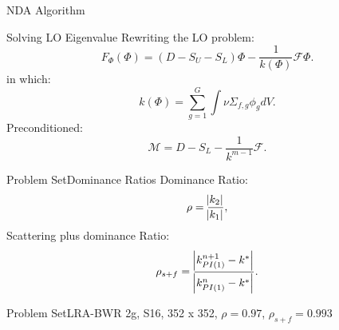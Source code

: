 \documentclass[sans,mathserif,aspectratio=169]{beamer}
\begin{document}
\begin{frame}{NDA Algorithm}
\centering
{}
\end{frame}

\begin{frame}{Solving LO Eigenvalue}
Rewriting the LO problem:
\begin{equation*}
F_\Phi \left( \Phi \right) = \left( D - S_U - S_L \right) \Phi - \frac{1}{k(\Phi)} \mathscr{F} \Phi.
\end{equation*}
in which:
\begin{equation*}
k\left( \Phi \right) = \sum_{g=1}^G \int \nu \Sigma_{f,g} \phi_g dV.
\end{equation*}
Preconditioned:
\begin{equation*}
\mathscr{M} = D - S_L - \frac{1}{k^{m-1}} \mathscr{F}.
\end{equation*}
\end{frame}

\begin{frame}{Problem Set}{Dominance Ratios}
Dominance Ratio:
\begin{equation*}
 \rho = \frac{\abs{k_2}}{\abs{k_1}},
\end{equation*}
\pause
Scattering plus dominance Ratio:
\begin{equation*}
 \rho_{s+f} = \frac{\abs{k_{PI(1)}^{n+1} - k^*}}{\abs{k_{PI(1)}^n - k^*}}.
\end{equation*}
\end{frame}

\begin{frame}{Problem Set}{LRA-BWR 2g, S16, 352 x 352, $\rho = 0.97$, $\rho_{s+f} = 0.993$}
\centering
{}
\end{frame}
\end{document}
